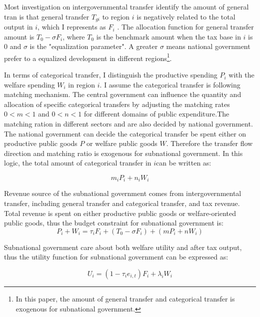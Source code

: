 Most investigation on intergovernmental transfer identify the amount of general tran is that general transfer $T_{gi}$ to region $i$ is negatively related to the total output in $i$,\label{gttt} which I represents as $F_i$ \parencite{buettner2006incentive, egger2010fiscal,kothenburger2002tax}. The allocation function for general transfer amount is $T_0-\sigma F_i$, where $T_0$ is the benchmark amount when the tax base in $i$ is 0 and $\sigma$ is the "equalization parameter". A greater $\sigma$ means national government prefer to a equalized development in different regions\footnote{In this paper, the amount of general transfer and categorical transfer is exogenous for subnational government.}.

In terms of categorical transfer, I distinguish the productive spending $P_i$ with the welfare spending $W_i$ in region $i$\label{pandwww}. I assume the categorical transfer is following matching mechanism. The central government can influence the quantity and allocation of specific categorical transfers by adjusting the matching rates $0<m<1$ and $0<n<1$\label{matchcc} for different domains of public expenditure.The matching ration in different sectors and are also decided by national government. The national government can decide the categorical transfer be spent either on productive public goods $P$ or welfare public goods $W$. Therefore the transfer flow direction and matching ratio is exogenous for subnational government. In this logic, the total amount of categorical transfer in $i$can be written as:

\begin{equation}
    m_iP_i+n_iW_i
\end{equation}

Revenue source of the subnational government comes from intergovernmental transfer, including general transfer and categorical transfer, and tax revenue. Total revenue is spent on either productive public goods or welfare-oriented public goods, thus the budget constraint for subnational government is:
\begin{equation}
    P_i + W_i = \tau_i F_i + (T_0 - \sigma F_i) + (m P_i + n W_i)\label{1}
\end{equation}

Subnational government care about both welfare utility and after tax output, thus the utility function for subnational government can be expressed as:

\begin{equation}
    U_i = (1 - \tau_i e_{i,t}) F_i + \lambda_iW_i \label{U}
\end{equation}

